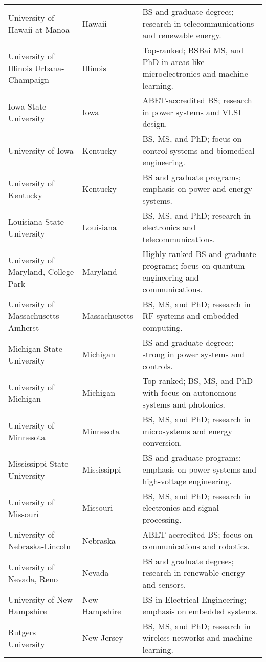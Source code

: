 \documentclass[12pt]{article}
\begin{document}
\begin{longtable}{p{} p{} p{}}
University of Hawaii at Manoa & Hawaii & BS and graduate degrees; research in telecommunications and renewable energy. \\
University of Illinois Urbana-Champaign & Illinois & Top-ranked; BSBai MS, and PhD in areas like microelectronics and machine learning. \\
Iowa State University & Iowa & ABET-accredited BS; research in power systems and VLSI design. \\
University of Iowa & Kentucky & BS, MS, and PhD; focus on control systems and biomedical engineering. \\
University of Kentucky & Kentucky & BS and graduate programs; emphasis on power and energy systems. \\
Louisiana State University & Louisiana & BS, MS, and PhD; research in electronics and telecommunications. \\
University of Maryland, College Park & Maryland & Highly ranked BS and graduate programs; focus on quantum engineering and communications. \\
University of Massachusetts Amherst & Massachusetts & BS, MS, and PhD; research in RF systems and embedded computing. \\
Michigan State University & Michigan & BS and graduate degrees; strong in power systems and controls. \\
University of Michigan & Michigan & Top-ranked; BS, MS, and PhD with focus on autonomous systems and photonics. \\
University of Minnesota & Minnesota & BS, MS, and PhD; research in microsystems and energy conversion. \\
Mississippi State University & Mississippi & BS and graduate programs; emphasis on power systems and high-voltage engineering. \\
University of Missouri & Missouri & BS, MS, and PhD; research in electronics and signal processing. \\
University of Nebraska-Lincoln & Nebraska & ABET-accredited BS; focus on communications and robotics. \\
University of Nevada, Reno & Nevada & BS and graduate degrees; research in renewable energy and sensors. \\
University of New Hampshire & New Hampshire & BS in Electrical Engineering; emphasis on embedded systems. \\
Rutgers University & New Jersey & BS, MS, and PhD; research in wireless networks and machine learning. \\

\end{longtable}
\end{document}

